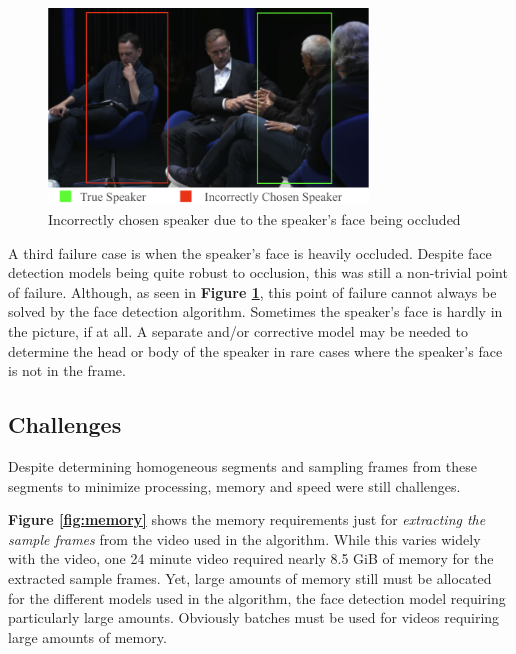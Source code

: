 \documentclass{article}
\begin{document}
\begin{figure}[htb]
\begin{minipage}[b]{1.0\linewidth}
    \centering
    \centerline{\includegraphics[width=8.5cm]{occluded-face.png}}
    \medskip
\end{minipage}
\caption{Incorrectly chosen speaker due to the speaker's face being occluded}
\label{fig:occluded-face}
\end{figure}

A third failure case is when the speaker's face is heavily occluded. Despite face detection models being quite robust to occlusion, this was still a non-trivial point of failure. Although, as seen in \textbf{Figure \ref{fig:occluded-face}}, this point of failure cannot always be solved by the face detection algorithm. Sometimes the speaker's face is hardly in the picture, if at all. A separate and/or corrective model may be needed to determine the head or body of the speaker in rare cases where the speaker's face is not in the frame.


\subsection{Challenges}
\label{ssec:challenges}
Despite determining homogeneous segments and sampling frames from these segments to minimize processing, memory and speed were still challenges.

\textbf{Figure \ref{fig:memory}} shows the memory requirements just for \emph{extracting the sample frames} from the video used in the algorithm. While this varies widely with the video, one 24 minute video required nearly 8.5 GiB of memory for the extracted sample frames. Yet, large amounts of memory still must be allocated for the different models used in the algorithm, the face detection model requiring particularly large amounts. Obviously batches must be used for videos requiring large amounts of memory. 
\end{document}
